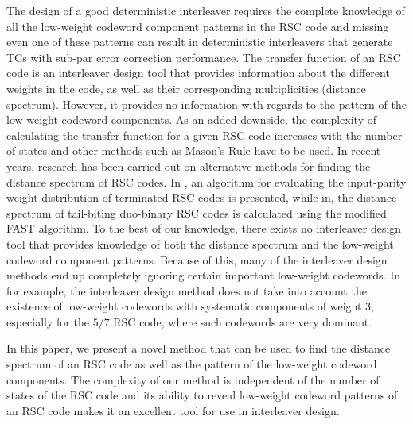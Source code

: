 The design of a good deterministic interleaver requires the complete knowledge of all the low-weight codeword component patterns in the RSC code and missing even one of these patterns can result in deterministic interleavers that generate TCs with sub-par error correction performance.
The transfer function of an RSC code is an interleaver design tool that provides information about the different weights in the code, as well as their corresponding multiplicities (distance spectrum). 
However, it provides no information with regards to the pattern of the low-weight codeword components. As an added downside, the complexity of calculating the transfer function for a given RSC code increases with the number of states and other methods such as Mason's Rule \cite{ref3} have to be used. In recent years, research has been carried out on alternative methods for finding the distance spectrum of RSC codes. In \cite{ref8}, an algorithm for evaluating the input-parity weight distribution of terminated RSC codes is presented, while in\cite{ref9},  the distance spectrum  of tail-biting duo-binary RSC codes is calculated using the modified FAST algorithm. To the best of our knowledge, there exists no interleaver design tool that provides knowledge of both the distance spectrum and the low-weight codeword component patterns. Because of this, many of the interleaver design methods end up completely ignoring certain important low-weight codewords. In \cite{ref5} for example, the interleaver design method does not take into account the existence of low-weight codewords with systematic components of weight 3, especially for the $5/7$  RSC code, where such codewords are very dominant.

In this paper, we present a novel method that can be used to find the distance spectrum of an RSC code as well as the pattern of the low-weight codeword components. The complexity of our method is independent of the number of states of the RSC code and its ability to reveal low-weight codeword patterns of an RSC code makes it an excellent tool for use in interleaver design.

